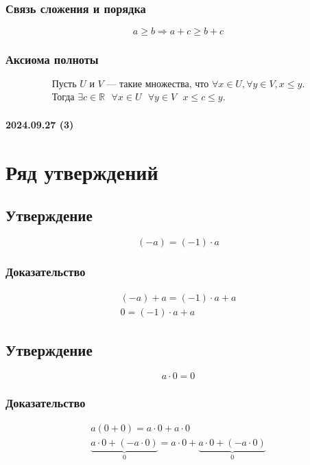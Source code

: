 \documentclass{article}
\begin{document}
\subsubsection{Связь сложения и порядка}
\[
    a \ge b \Rightarrow a + c \ge b + c
\]

\subsubsection{Аксиома полноты}
\begin{gather*}
    \text{Пусть } U \text{ и } V \text{ --- такие множества, что } \forall x \in U, \forall y \in V, x \le y. \\
    \text{Тогда } \exists c \in \mathbb{R} ~~~ \forall x \in U ~~~ \forall y \in V ~~~ x \le c \le y. 
\end{gather*}



\paragraph{2024.09.27 (3)}
\section{Ряд утверждений}

\subsection{Утверждение}
\[
    (-a) = (-1) \cdot a
\]

\subsubsection{Доказательство}
\begin{gather*}
    (-a) + a = (-1) \cdot a + a \\
    0 = (-1) \cdot a + a
\end{gather*}


\subsection{Утверждение}
\[
    a \cdot 0 = 0
\]

\subsubsection{Доказательство}
\begin{gather*}
    a(0 + 0) = a \cdot 0 + a \cdot 0 \\
    \underbrace{a \cdot 0 + (-a \cdot 0)}_{0} = a \cdot 0 + \underbrace{a \cdot 0 + (-a \cdot 0)}_{0}
\end{gather*}
\end{document}
